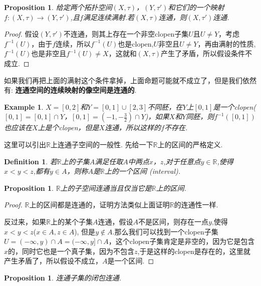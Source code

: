 \documentclass{article}
\newtheorem{proposition}[theorem]{Proposition}
\newtheorem{example}[theorem]{Example}
\newtheorem{definition}[theorem]{Definition}
\newcommand*{\xfunc}[4]{{#2}\colon{#3}{#1}{#4}}
\newcommand*{\func}[3]{\xfunc{\to}{#1}{#2}{#3}}
\begin{document}
\begin{proposition}
给定两个拓扑空间$(X,\tau)$，$(Y,\tau')$和它们的一个映射$\func{f}{(X,\tau)}{(Y,\tau')}$,且$f$满足连续满射.若$(X,\tau)$连通，则$(X,\tau')$连通.
\end{proposition}

\begin{proof}
\rm 假设$(Y,\tau')$不连通，则其上存在一个非空clopen子集$U$且$U \neq Y$，考虑$f^{-1}(U)$，由于$f$连续，所以$f^{-1}(U)$也是clopen,$U$非空且$U \neq Y$，再由满射的性质,$f^{-1}(U)$也是非空且$f^{-1}(U) \neq X$，这就和$(X,\tau)$产生了矛盾，所以假设条件不成立.
\end{proof}

如果我们再把上面的满射这个条件拿掉，上面命题可能就不成立了，但是我们依然有: \textbf{连通空间的连续映射的像空间是连通的}.

\begin{example}
\rm $X=[0,2]$和$Y=[0,1] \cup [2,3]$不同胚，在$Y$上$[0,1]$是一个clopen($[0,1] = [0,1] \cap Y$，$[0,1] = (-1,-\frac{3}{2}) \cap Y$)，如果$X$和$Y$同胚，则$f^{-1}([0,1])$也应该在$X$上是个clopen，但是$X$连通，所以这样的$f$不存在.
\end{example}

这里可以引出$\mathbb{R}$上连通子空间的一般性. 先给一下$\mathbb{R}$上的区间的严格定义.

\begin{definition}
若$\mathbb{R}$上的子集$A$满足任取$A$中两点$x$，$z$,对于任意点$y \in \mathbb{R}$,使得$x < y < z$,都有$y \in A$，则称$A$是$\mathbb{R}$上的一个区间 \rm (interval).
\end{definition}

\begin{proposition}
$\mathbb{R}$上的子空间连通当且仅当它是$\mathbb{R}$上的区间.
\end{proposition}

\begin{proof}
$\mathbb{R}$上的区间都是连通的，证明方法类似上面证明$\mathbb{R}$的连通性一样.

\rm 反过来，如果$\mathbb{R}$上的某个子集$A$连通，假设$A$不是区间，则存在一点$y$,使得$x< y < z$($x \in A,z \in A$), 但是$y \notin A$.那么我们可以找到一个clopen子集$U = (-\infty,y) \cap A = (-\infty,y] \cap A $，这个clopen子集肯定是非空的，因为它是包含$x$的，同时它也是一个真子集，因为不包含$z$,于是这样的clopen是存在的，这里就产生矛盾了，所以假设不成立，$A$是一个区间.
\end{proof}


\begin{proposition}
连通子集的闭包连通.
\end{proposition}
\end{document}
